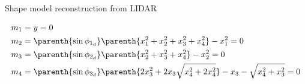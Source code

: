 \documentclass[final, usenames, dvipsnames]{beamer}
\newlength{\twocolwidth}
\begin{document}
\begin{frame}[t]
\begin{columns}[T,onlytextwidth]
\begin{column}{\twocolwidth}
\begin{block}{Shape model reconstruction from LIDAR}
\begin{minipage}[t]{0.5\columnwidth}
\begin{itemize}
    \end{itemize}
        \begin{align*}\label{eq:terminal_constraints}
            \begin{split}
                m_1 &= y = 0  \\
                m_2 &= \parenth{\sin \phi_{1_{d}}} \parenth{ x_1^2 + x_2^2 + x_3^2 + x_4^2} - x_1^2 = 0 \\
                m_3 &= \parenth{\sin \phi_{2_{d}}} \parenth{ x_2^2 + x_3^2 + x_4^2} - x_2^2 = 0\\
                m_4 &= \parenth{\sin \phi_{3_{d}}} \parenth{ 2 x_3^2 + 2 x_3 \sqrt{x_4^2 + 2 x_4^2}} - x_3 - \sqrt{x_4^2 + x_3^2} = 0 
            \end{split}
        \end{align*}
    \end{minipage}


\end{block}
\end{column}
\end{columns}
\end{frame}
\end{document}
